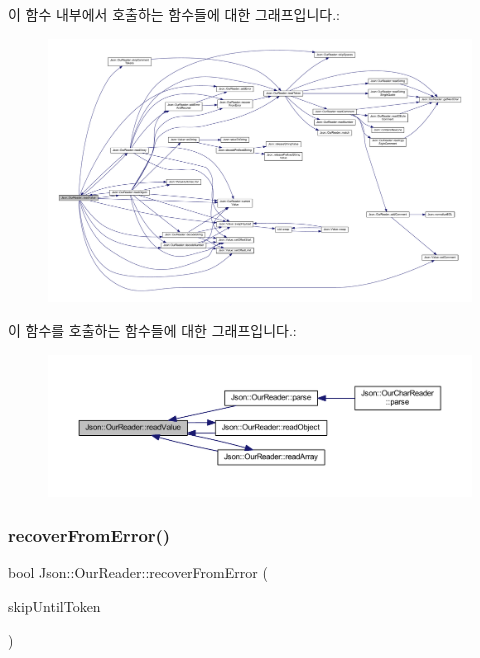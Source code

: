 이 함수 내부에서 호출하는 함수들에 대한 그래프입니다.\+:\nopagebreak
\begin{figure}[H]
\begin{center}
\leavevmode
\includegraphics[width=350pt]{class_json_1_1_our_reader_a1765d9670d191c89a57a22ea5591d35f_cgraph}
\end{center}
\end{figure}
이 함수를 호출하는 함수들에 대한 그래프입니다.\+:\nopagebreak
\begin{figure}[H]
\begin{center}
\leavevmode
\includegraphics[width=350pt]{class_json_1_1_our_reader_a1765d9670d191c89a57a22ea5591d35f_icgraph}
\end{center}
\end{figure}
\mbox{\label{class_json_1_1_our_reader_a035651f0700a76a815e5f904c63ebb1c}} 
\subsubsection{\texorpdfstring{recover\+From\+Error()}{recoverFromError()}}
{\footnotesize\ttfamily bool Json\+::\+Our\+Reader\+::recover\+From\+Error (\begin{DoxyParamCaption}\item[{\hyperlink{class_json_1_1_our_reader_a15116f7276ddf1e7a2cc3cbefa884dcc}{Token\+Type}}]{skip\+Until\+Token }\end{DoxyParamCaption})\hspace{0.3cm}{\ttfamily [private]}}



